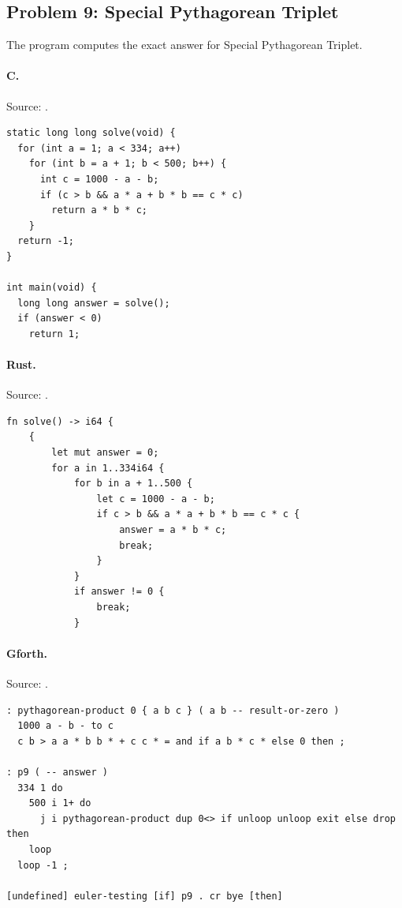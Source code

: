 \subsection{Problem 9: Special Pythagorean Triplet}
\label{walkthrough:p9}
The program computes the exact answer for Special Pythagorean Triplet.

\paragraph{C.} Source: .
\begin{lstlisting}
static long long solve(void) {
  for (int a = 1; a < 334; a++)
    for (int b = a + 1; b < 500; b++) {
      int c = 1000 - a - b;
      if (c > b && a * a + b * b == c * c)
        return a * b * c;
    }
  return -1;
}

int main(void) {
  long long answer = solve();
  if (answer < 0)
    return 1;
\end{lstlisting}

\paragraph{Rust.} Source: .
\begin{lstlisting}
fn solve() -> i64 {
    {
        let mut answer = 0;
        for a in 1..334i64 {
            for b in a + 1..500 {
                let c = 1000 - a - b;
                if c > b && a * a + b * b == c * c {
                    answer = a * b * c;
                    break;
                }
            }
            if answer != 0 {
                break;
            }
\end{lstlisting}

\paragraph{Gforth.} Source: .
\begin{lstlisting}
: pythagorean-product 0 { a b c } ( a b -- result-or-zero )
  1000 a - b - to c
  c b > a a * b b * + c c * = and if a b * c * else 0 then ;

: p9 ( -- answer )
  334 1 do
    500 i 1+ do
      j i pythagorean-product dup 0<> if unloop unloop exit else drop then
    loop
  loop -1 ;

[undefined] euler-testing [if] p9 . cr bye [then]
\end{lstlisting}

